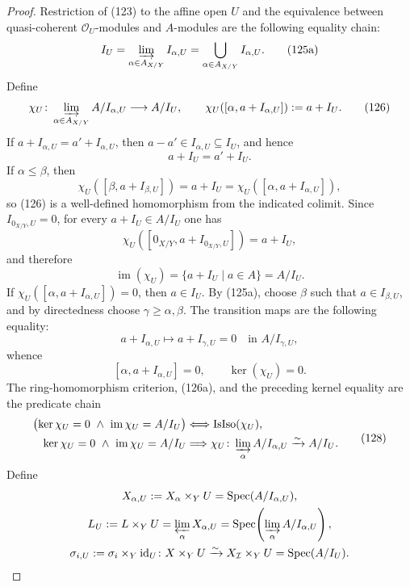 \begin{proof}
  Restriction of (123) to the affine open $U$ and the equivalence between
  quasi-coherent $\mathcal O_U$-modules and $A$-modules are the following
  equality chain:
  \[
    I_U=\varinjlim_{\alpha\in A_{X/Y}}I_{\alpha,U}
       =\bigcup_{\alpha\in A_{X/Y}}I_{\alpha,U}.                \tag{125a}
  \]
  Define
  \[
    \chi_U\colon
      \varinjlim_{\alpha\in A_{X/Y}}A/I_{\alpha,U}\longrightarrow A/I_U,
    \qquad
    \chi_U([\alpha,a+I_{\alpha,U}]):=a+I_U.                    \tag{126}
  \]
  If
  $a+I_{\alpha,U}=a'+I_{\alpha,U}$, then
  $a-a'\in I_{\alpha,U}\subseteq I_U$, and hence
  \[
    a+I_U=a'+I_U.
  \]
  If $\alpha\leq\beta$, then
  \[
    \chi_U([\beta,a+I_{\beta,U}])=a+I_U
      =\chi_U([\alpha,a+I_{\alpha,U}]),
  \]
  so (126) is a well-defined homomorphism from the indicated colimit.  Since
  $I_{0_{X/Y},U}=0$, for every $a+I_U\in A/I_U$ one has
  \[
    \chi_U([0_{X/Y},a+I_{0_{X/Y},U}])=a+I_U,
  \]
  and therefore
  \[
    \operatorname{im}(\chi_U)
      =\{a+I_U\mid a\in A\}=A/I_U.                             \tag{126a}
  \]
  If $\chi_U([\alpha,a+I_{\alpha,U}])=0$, then
  $a\in I_U$.  By (125a), choose $\beta$ such that
  $a\in I_{\beta,U}$, and by directedness choose
  $\gamma\geq\alpha,\beta$.  The transition maps are the following
  equality:
  \[
    a+I_{\alpha,U}\longmapsto a+I_{\gamma,U}=0
      \quad\text{in }A/I_{\gamma,U},                           \tag{127}
  \]
  whence
  \[
    [\alpha,a+I_{\alpha,U}]=0,
    \qquad
    \ker(\chi_U)=0.
  \]
  The ring-homomorphism criterion, (126a), and the preceding kernel equality
  are the predicate chain
  \[
  \begin{aligned}
    \bigl(\ker\chi_U=0\ \wedge\
      \operatorname{im}\chi_U=A/I_U\bigr)
      &\Longleftrightarrow \operatorname{IsIso}(\chi_U),\\
    \ker\chi_U=0\ \wedge\
      \operatorname{im}\chi_U=A/I_U
      &\Longrightarrow
      \chi_U\colon\varinjlim_\alpha A/I_{\alpha,U}
        \xrightarrow{\sim}A/I_U.
  \end{aligned}                                                     \tag{128}
  \]
  Define
  \[
  \begin{gathered}
    X_{\alpha,U}:=X_\alpha\times_YU
      =\operatorname{Spec}(A/I_{\alpha,U}),\\
    L_U:=L\times_YU=\varprojlim_\alpha X_{\alpha,U}
      =\operatorname{Spec}\!\left(
        \varinjlim_\alpha A/I_{\alpha,U}\right),\\
    \sigma_{i,U}:=\sigma_i\times_Y\operatorname{id}_U\colon
      X\times_YU\xrightarrow{\sim}
      X_{\mathcal I}\times_YU=\operatorname{Spec}(A/I_U).       

\end{gathered}\]
\end{proof}
